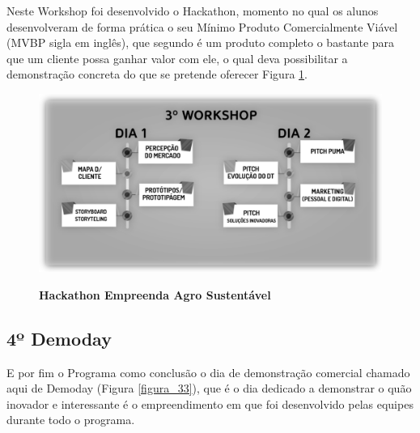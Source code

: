 Neste Workshop foi desenvolvido o Hackathon, momento no qual os alunos desenvolveram de forma prática o seu Mínimo Produto Comercialmente Viável (MVBP sigla em inglês), que segundo  é um produto completo o bastante para que um cliente possa ganhar valor com ele, o qual deva possibilitar a demonstração concreta do que se pretende oferecer Figura \ref{figura_32}. 


\begin{figure}[H]
\centering
\caption{\textbf{Hackathon Empreenda Agro Sustentável}}
\includegraphics[scale=0.3]{Imagens/workshop-03.png}
\label{figura_32}
\end{figure}

\subsection{4º Demoday}

E por fim o Programa como conclusão o dia de demonstração comercial chamado aqui de Demoday (Figura \ref{figura_33}), que é o dia dedicado a demonstrar o quão inovador e interessante é o empreendimento em que foi desenvolvido pelas equipes durante todo o programa.


